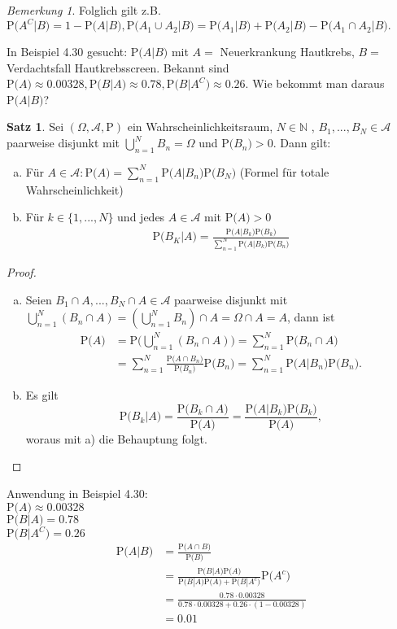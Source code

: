 \documentclass[a4paper,12pt,fleqn]{scrartcl}
\newcommand{\m}[1]{\mathcal{ #1 }}
\newcommand{\p}[1]{\text{P(} #1 \text{)}}
\newcommand{\WR}{Wahrscheinlichkeitsraum}
\theoremstyle{definition}
\newtheorem{satz}[definition]{Satz}
\theoremstyle{plain}
\theoremstyle{remark}
\newtheorem*{bemerkung}{Bemerkung}
\begin{document}
\begin{bemerkung}
Folglich gilt z.B. $\p{A^C | B} = 1 - \p{A | B}, \p{A_1 \cup A_2 | B} = \p{A_1 | B} + \p{A_2 | B} - \p{A_1 \cap A_2 | B}.$
\end{bemerkung}
In Beispiel 4.30 gesucht: $\p{A | B}$ mit $A=$ \glqq Neuerkrankung Hautkrebs\grqq, $B=$ \glqq Verdachtsfall Hautkrebsscreen\grqq. Bekannt sind $\p{A} \approx 0.00328, \p{B | A} \approx 0.78, \p{B | A^C} \approx 0.26$. Wie bekommt man daraus $\p{A | B}$?

\begin{satz}
Sei $(\Omega, \m{A}, \text{P})$ ein \WR, $N \in \mathbb{N}$ , $B_1 , ... , B_N \in \m{A}$ paarweise disjunkt mit $\bigcup_{n = 1}^{N}{B_n} = \Omega$ und $\p{B_n} > 0 $. Dann gilt:
\begin{enumerate}[a)]
\item Für $A \in \m{A}: \p{A} = \sum_{n=1}^{N}{\p{A|B_n}\p{B_N}}$ (Formel für totale Wahrscheinlichkeit)
\item Für $k \in \{ 1,...,N \} $ und jedes $A \in \m{A}$ mit $\p{A} > 0$
\begin{align*}
\p{B_K | A} = \frac{\p{A|B_k}\p{B_k}}{\sum_{n=1}^{N}{\p{A|B_k}\p{B_n}}}
\end{align*}
\end{enumerate} 
\end{satz}
\begin{proof}
\begin{enumerate}[a)]
\item Seien $B_1 \cap A,...,B_N \cap A \in \m{A}$ paarweise disjunkt mit $ \bigcup_{n=1}^{N}{(B_n \cap A)} = ( \bigcup_{n=1}^{N}{B_n}) \cap A = \Omega \cap A = A $, dann ist
\begin{align*}
\p{A} &= \p{\bigcup_{n=1}^{N}{(B_n \cap A)}} = \sum_{n=1}^{N}{\p{B_n \cap A}} \\
 &= \sum_{n=1}^{N}{ \frac{\p{A \cap B_n}}{\p{B_n}}\p{B_n}} = \sum_{n=1}^{N}{\p{A|B_n}\p{B_n}}.
\end{align*}
\item Es gilt
\[\p{B_k|A} = \frac{\p{B_k \cap A}}{\p{A}} = \frac{\p{A|B_k}\p{B_k}}{\p{A}},\]
woraus mit a) die Behauptung folgt.
\end{enumerate}
\end{proof}

Anwendung in Beispiel 4.30:\\
$\p{A} \approx 0.00328$ \\
$\p{B|A} = 0.78 $\\
$\p{B|A^C} = 0.26$
\begin{align*}
\p{A|B} &= \frac{\p{A \cap B}}{\p{B}} \\
&= \frac{\p{B|A}\p{A}}{\p{B|A}\p{A}+\p{B|A^c}}\p{A^c} \\
&= \frac{0.78 \cdot 0.00328}{0.78 \cdot 0.00328 + 0.26 \cdot (1-0.00328)}\\
&= 0.01 
\end{align*}
\end{document}
